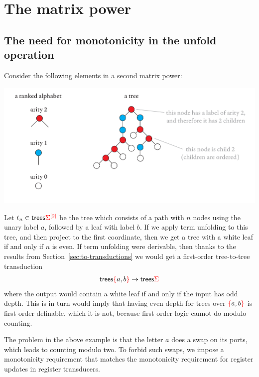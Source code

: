 \section{The matrix power}
\label{ap:matrix-power}
\newcommand{\treeunfold}{\mathrm{unfold}}

\subsection{The need for monotonicity in the unfold operation}

\begin{example}\label{eq:twist}
    Consider the following elements in a second matrix power:
\begin{center}
\includegraphics[scale=.3, page=84]{pics.pdf}
\end{center}
Let $t_n \in \mathsf {trees} {\color{red}{\Sigma}}^{{\color{red}{[2]}}}$ be the tree which consists of a path with $n$ nodes using the unary label $a$, followed by a leaf with label $b$. If we apply term unfolding to this tree, and then project to the first coordinate, then we get a tree with a white leaf if and only if  $n$ is even.  If term unfolding were derivable, then thanks to the results from Section~\ref{sec:to-transductions}  we would get a first-order tree-to-tree transduction 
\begin{align*}
\mathsf {trees} {\color{red}{\{}}a,b {\color{red}{\}}} \to \mathsf {trees} {\color{red}{\Sigma}}
\end{align*}
where the output would contain a white leaf if and only if the input has odd depth. This is in turn would imply that having even depth for trees over ${\color{red}{\{}}a,b {\color{red}{\}}}$ is first-order definable, which it is not, because first-order logic cannot do modulo counting.
\end{example}
The problem in the above example is that the letter $a$ does a swap on its ports, which leads to counting modulo two. To forbid such swaps, we impose a monotonicity requirement that matches the monotonicity requirement for register updates in register transducers.

